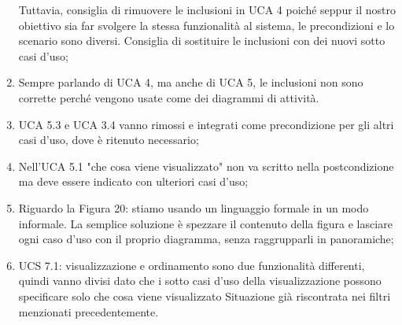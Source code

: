 \begin{enumerate}
	Tuttavia, consiglia di rimuovere le inclusioni in UCA 4 poiché seppur il nostro obiettivo sia far svolgere la stessa funzionalità al sistema, le precondizioni e lo scenario sono diversi.
	Consiglia di sostituire le inclusioni con dei nuovi sotto casi d'uso;
	\item Sempre parlando di UCA 4, ma anche di UCA 5, le inclusioni non sono corrette perché vengono usate come dei diagrammi di attività.
	\item UCA 5.3 e UCA 3.4 vanno rimossi e integrati come precondizione per gli altri casi d'uso, dove è ritenuto necessario;
	\item Nell'UCA 5.1 "che cosa viene visualizzato" non va scritto nella postcondizione ma deve essere indicato con ulteriori casi d'uso;
	\item Riguardo la Figura 20: stiamo usando un linguaggio formale in un modo informale.
	La semplice soluzione è spezzare il contenuto della figura e lasciare ogni caso d'uso con il proprio diagramma, senza raggrupparli in panoramiche;
	\item UCS 7.1: visualizzazione e ordinamento sono due funzionalità differenti, quindi vanno divisi dato che i sotto casi d'uso della visualizzazione possono specificare solo che cosa viene visualizzato
	Situazione già riscontrata nei filtri menzionati precedentemente.
\end{enumerate}

\clearpage